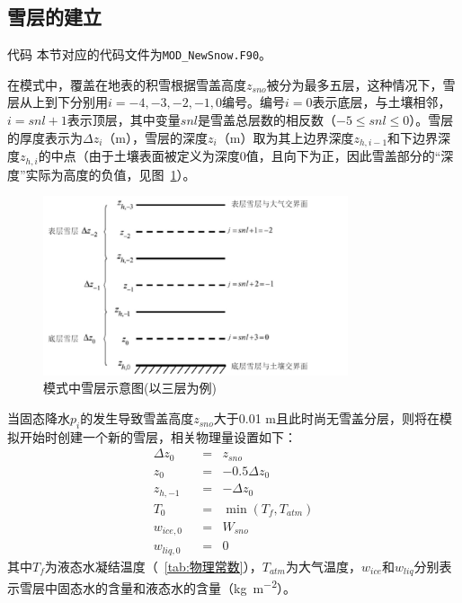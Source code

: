 \subsection{雪层的建立}
\begin{mymdframed}{代码}
本节对应的代码文件为\texttt{MOD\_NewSnow.F90}。
\end{mymdframed}

在模式中，覆盖在地表的积雪根据雪盖高度$z_{sno}$被分为最多五层，这种情况下，雪层从上到下分别用$i = −4, −3, −2, −1, 0$编号。编号$i = 0$表示底层，与土壤相邻，$i = snl + 1$表示顶层，其中变量$snl$是雪盖总层数的相反数（$-5\leqslant snl\leqslant 0$）。雪层的厚度表示为$\Delta z_i$（m），雪层的深度$z_i$（m）取为其上边界深度$z_{h,i-1}$和下边界深度$z_{h,i}$的中点（由于土壤表面被定义为深度0值，且向下为正，因此雪盖部分的“深度”实际为高度的负值，见图~\ref{fig:模式中积雪雪层示意图}）。
{
\begin{figure}[h]
\centering
\includegraphics[width=0.8\textwidth]{Figures/雪盖土壤热力过程/模式中积雪雪层示意图.png}
\caption{模式中雪层示意图(以三层为例)}
\label{fig:模式中积雪雪层示意图}
\end{figure}
}

当固态降水$p_{i}$的发生导致雪盖高度$z_{sno}$大于0.01 m且此时尚无雪盖分层，则将在模拟开始时创建一个新的雪层，相关物理量设置如下：
\begin{equation}
\begin{aligned}
& \Delta z_{0} &&= &{z}_{sno}& \\
& z_0 &&= &-0.5\Delta z_0& \\
& z_{h,-1} &&= &-\Delta z_0& \\
& T_0 &&= &\min \left(T_f,T_{atm}\right)& \\
& w_{ice,0} &&= &W_{sno}& \\
& w_{liq,0} &&= &0&
\end{aligned}
\end{equation}
其中$T_f$为液态水凝结温度（~\ref{tab:物理常数}），$T_{atm}$为大气温度，$w_{ice}$和$w_{liq}$分别表示雪层中固态水的含量和液态水的含量（\unit{kg.m^{-2}}）。


